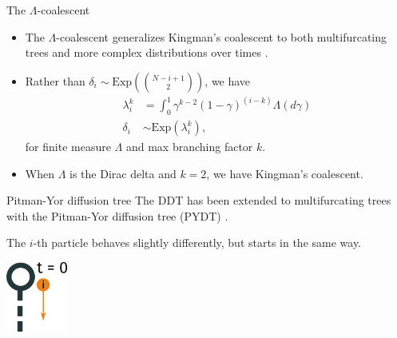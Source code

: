 \documentclass[10pt, compress]{beamer}
\begin{document}
\begin{frame}{The $\Lambda$-coalescent}
  \begin{itemize}
    \item<1-> The $\Lambda$-coalescent generalizes Kingman's coalescent
      to both multifurcating trees and more complex
      distributions over times \cite{Pitman1999}.

    \item<2-> Rather than 
      $\delta_i \sim \mathrm{Exp}\left(\binom{N - i + 1}{2}\right)$,
      we have
      \begin{align}
        \lambda_i^k &= \int_0^1 \gamma^{k - 2}(1 - \gamma)^{(i-k)}\Lambda(d\gamma)\\
        \delta_i &\sim \mathrm{Exp}\left(\lambda_i^k\right),
      \end{align}
      for finite measure $\Lambda$ and max branching factor $k$.
    \item<3-> When $\Lambda$ is the Dirac delta and $k = 2$,
      we have Kingman's coalescent.

  \end{itemize}
\end{frame}


\begin{frame}{Pitman-Yor diffusion tree}
  The DDT has been extended to
  multifurcating trees with the Pitman-Yor diffusion tree (PYDT) \cite{Knowles2015}.

  The $i$-th particle behaves slightly differently, but
  starts in the same way.

  \begin{center}
      \includegraphics[width=0.15\textwidth]{img/ddt-1}
  \end{center}

\end{frame}
\end{document}
